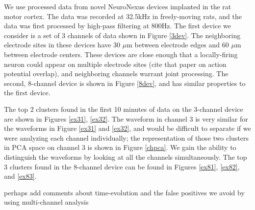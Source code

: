 We use processed data from novel NeuroNexus devices implanted in the rat motor cortex.  The data was recorded at 32.5kHz in freely-moving rats, and the data was first processed by high-pass filtering at 800Hz.  The first device we consider is a set of 3 channels of data shown in Figure \ref{3dev}.  The neighboring electrode sites in these devices have 30 $\mu$m between electrode edges and 60 $\mu$m between electrode centers.  These devices are close enough that a locally-firing neuron could appear on multiple electrode sites (cite that paper on action potential overlap), and neighboring channels warrant joint processing.  The second, 8-channel device is shown in Figure \ref{8dev}, and has similar properties to the first device.

 The top 2 clusters found in the first 10 minutes of data on the 3-channel device are shown in Figures \ref{ex31}, \ref{ex32}.  The waveform in channel 3 is very similar for the waveforms in Figure \ref{ex31} and \ref{ex32}, and would be difficult to separate if we were analyzing each channel individually; the representation of those two clusters in PCA space on channel 3 is shown in Figure \ref{chpca}.  We gain the ability to distinguish the waveforms by looking at all the channels simultaneously.  The top 3 clusters found in the 8-channel device can be found in Figures \ref{ex81}, \ref{ex82}, and \ref{ex83}.

{\color{red} perhaps add comments about time-evolution and the false positives we avoid by using multi-channel analysis}


